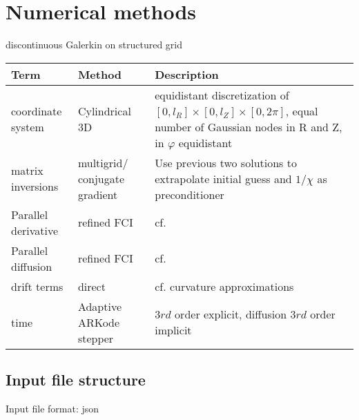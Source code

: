 \section{Numerical methods}
discontinuous Galerkin on structured grid
\begin{longtable}{ll>{\RaggedRight}p{7cm}}
\toprule
\rowcolor{gray!50}\textbf{Term} &  \textbf{Method} & \textbf{Description}  \\ \midrule
    coordinate system & Cylindrical 3D & equidistant discretization of $[0,l_R] \times [0,l_Z] \times [0,2\pi]$, equal number of Gaussian nodes in R and Z, in $\varphi$ equidistant \\
matrix inversions & multigrid/ conjugate gradient & Use previous two solutions to extrapolate initial guess and $1/\chi$ as preconditioner \\
Parallel derivative & refined  FCI & cf.~\cite{Held2016,Stegmeir2017} \\
Parallel diffusion & refined FCI & cf.~\cite{Held2016,Stegmeir2017} \\
drift terms & direct & cf. curvature approximations \\
time & Adaptive ARKode stepper & $3rd$ order explicit, diffusion $3rd$ order implicit \\
\bottomrule
\end{longtable}

\subsection{Input file structure}
Input file format: json

